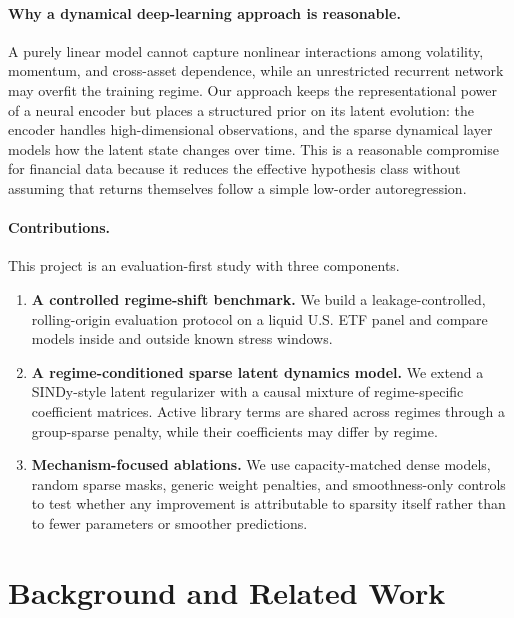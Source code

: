 \documentclass{article}
\begin{document}
\paragraph{Why a dynamical deep-learning approach is reasonable.}
A purely linear model cannot capture nonlinear interactions among volatility, momentum, and cross-asset dependence, while an unrestricted recurrent network may overfit the training regime. Our approach keeps the representational power of a neural encoder but places a structured prior on its latent evolution: the encoder handles high-dimensional observations, and the sparse dynamical layer models how the latent state changes over time. This is a reasonable compromise for financial data because it reduces the effective hypothesis class without assuming that returns themselves follow a simple low-order autoregression.

\paragraph{Contributions.}
This project is an evaluation-first study with three components.
\begin{enumerate}
  \item \textbf{A controlled regime-shift benchmark.} We build a leakage-controlled, rolling-origin evaluation protocol on a liquid U.S. ETF panel and compare models inside and outside known stress windows.
  \item \textbf{A regime-conditioned sparse latent dynamics model.} We extend a SINDy-style latent regularizer with a causal mixture of regime-specific coefficient matrices. Active library terms are shared across regimes through a group-sparse penalty, while their coefficients may differ by regime.
  \item \textbf{Mechanism-focused ablations.} We use capacity-matched dense models, random sparse masks, generic weight penalties, and smoothness-only controls to test whether any improvement is attributable to sparsity itself rather than to fewer parameters or smoother predictions.
\end{enumerate}

\section{Background and Related Work}
\end{document}
